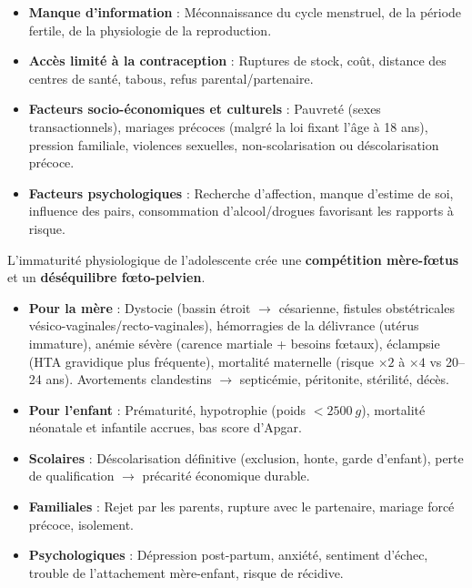 \documentclass[11pt]{article}
\newcommand{\cle}[1]{{\popxbold\color{popdark}#1}}
\newcounter{popsec}
\newcounter{popsub}
\newcommand{\courssub}[1]{%
  \stepcounter{popsub}%
  \par\vspace{9pt}\noindent{\popxbold\fontsize{11.5}{13}\selectfont\color{popink}{\color{poporange}\thepopsec.\thepopsub}\hspace{6pt}#1}\par\nopagebreak\vspace{4pt}
}
\begin{document}
\courssub{Causes}

\begin{aretenir}
\begin{itemize}
\item \textbf{Manque d'information} : Méconnaissance du cycle menstruel, de la période fertile, de la physiologie de la reproduction.
\item \textbf{Accès limité à la contraception} : Ruptures de stock, coût, distance des centres de santé, tabous, refus parental/partenaire.
\item \textbf{Facteurs socio-économiques et culturels} : Pauvreté (sexes transactionnels), mariages précoces (malgré la loi fixant l'âge à 18 ans), pression familiale, violences sexuelles, non-scolarisation ou déscolarisation précoce.
\item \textbf{Facteurs psychologiques} : Recherche d'affection, manque d'estime de soi, influence des pairs, consommation d'alcool/drogues favorisant les rapports à risque.
\end{itemize}
\end{aretenir}

\courssub{Conséquences}

\begin{propriete}
L'immaturité physiologique de l'adolescente crée une \textbf{compétition mère-fœtus} et un \textbf{déséquilibre fœto-pelvien}.
\begin{itemize}
\item \textbf{Pour la mère} : \cle{Dystocie} (bassin étroit $\rightarrow$ césarienne, fistules obstétricales vésico-vaginales/recto-vaginales), \cle{hémorragies} de la délivrance (utérus immature), \cle{anémie} sévère (carence martiale + besoins fœtaux), \cle{éclampsie} (HTA gravidique plus fréquente), \cle{mortalité maternelle} (risque $\times 2$ à $\times 4$ vs 20--24 ans). Avortements clandestins $\rightarrow$ septicémie, péritonite, stérilité, décès.
\item \textbf{Pour l'enfant} : \cle{Prématurité}, \cle{hypotrophie} (poids $< \SI{2500}{g}$), \cle{mortalité néonatale} et infantile accrues, bas score d'Apgar.
\end{itemize}
\end{propriete}

\begin{propriete}
\begin{itemize}
\item \textbf{Scolaires} : Déscolarisation définitive (exclusion, honte, garde d'enfant), perte de qualification $\rightarrow$ précarité économique durable.
\item \textbf{Familiales} : Rejet par les parents, rupture avec le partenaire, mariage forcé précoce, isolement.
\item \textbf{Psychologiques} : Dépression post-partum, anxiété, sentiment d'échec, trouble de l'attachement mère-enfant, risque de récidive.
\end{itemize}
\end{propriete}
\end{document}

